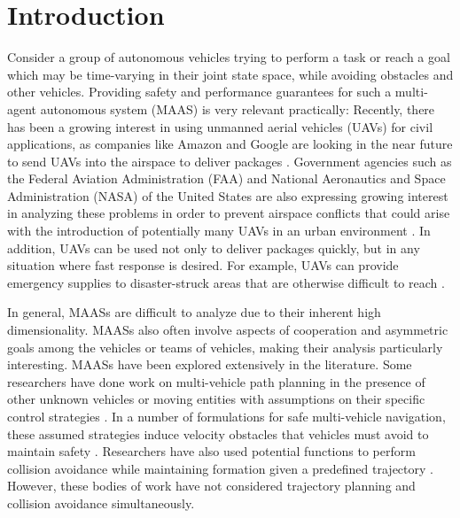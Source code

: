\section{Introduction}
Consider a group of autonomous vehicles trying to perform a task or reach a goal which may be time-varying in their joint state space, while avoiding obstacles and other vehicles. Providing safety and performance guarantees for such a multi-agent autonomous system (MAAS) is very relevant practically: Recently, there has been a growing interest in using unmanned aerial vehicles (UAVs) for civil applications, as companies like Amazon and Google are looking in the near future to send UAVs into the airspace to deliver packages \cite{primeAir,projectWing}. Government agencies such as the Federal Aviation Administration (FAA) and National Aeronautics and Space Administration (NASA) of the United States are also expressing growing interest in analyzing these problems in order to prevent airspace conflicts that could arise with the introduction of potentially many UAVs in an urban environment \cite{faa13}. In addition, UAVs can be used not only to deliver packages quickly, but in any situation where fast response is desired. For example, UAVs can provide emergency supplies to disaster-struck areas that are otherwise difficult to reach \cite{debusk10}.

In general, MAASs are difficult to analyze due to their inherent high dimensionality. %
 MAASs also often involve aspects of cooperation and asymmetric goals among the vehicles or teams of vehicles, making their analysis particularly interesting. %
MAASs have been explored extensively in the literature. Some researchers have done work on multi-vehicle path planning in the presence of other unknown vehicles or moving entities with assumptions on their specific control strategies \cite{chasparis05}. In a number of formulations for safe multi-vehicle navigation, these assumed strategies induce velocity obstacles that vehicles must avoid to maintain safety \cite{fiorini98, vandenberg08}. Researchers have also used potential functions to perform collision avoidance while maintaining formation given a predefined trajectory \cite{saber02,chuang07}. However, these bodies of work have not considered trajectory planning and collision avoidance simultaneously.

